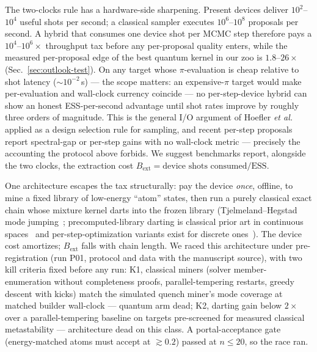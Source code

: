 \documentclass[aps,prx,reprint,floatfix,amsmath,amssymb,amsfonts]{revtex4-2}
\begin{document}
The two-clocks rule has a hardware-side sharpening. Present devices
deliver $10^{2}$--$10^{4}$ useful shots per second; a classical sampler
executes $10^{6}$--$10^{8}$ proposals per second. A hybrid that
consumes one device shot per MCMC step therefore pays a
$10^{4}$--$10^{6}\times$ throughput tax before any per-proposal quality
enters, while the measured per-proposal edge of the best quantum kernel
in our zoo is $1.8$--$26\times$ (Sec.~\ref{sec:outlook-test}). On any
target whose $\pi$-evaluation is cheap relative to shot latency
($\sim\!10^{-2}$\,s) --- the scope matters: an expensive-$\pi$ target
would make per-evaluation and wall-clock currency coincide --- no
per-step-device hybrid can show an honest ESS-per-second advantage
until shot rates improve by roughly three orders of magnitude. This is
the general I/O argument of Hoefler \emph{et
al.}~\cite{Hoefler2023} applied as a design selection rule for
sampling, and recent per-step proposals~\cite{AraiKadowaki2025,Lin2025}
report spectral-gap or per-step gains with no wall-clock metric ---
precisely the accounting the protocol above forbids. We suggest
benchmarks report, alongside the two clocks, the extraction cost
$B_{\mathrm{ext}} = \text{device shots consumed}/\text{ESS}$.

One architecture escapes the tax structurally: pay the device
\emph{once}, offline, to mine a fixed library of low-energy ``atom''
states, then run a purely classical exact chain whose mixture kernel
darts into the frozen library (Tjelmeland--Hegstad mode
jumping~\cite{Tjelmeland2001}; precomputed-library darting is classical
prior art in continuous spaces~\cite{Andricioaei2001,Sminchisescu2011}
and per-step-optimization variants exist for discrete
ones~\cite{Hubin2018}). The device cost amortizes; $B_{\mathrm{ext}}$
falls with chain length. We raced this architecture under
pre-registration (run P01, protocol and data with the manuscript
source), with two kill criteria fixed before any run: K1, classical
miners (solver member-enumeration without completeness proofs,
parallel-tempering restarts, greedy descent with kicks) match the
simulated quench miner's mode coverage at matched builder wall-clock
--- quantum arm dead; K2, darting gain below $2\times$ over a
parallel-tempering baseline on targets pre-screened for measured
classical metastability --- architecture dead on this class. A
portal-acceptance gate (energy-matched atoms must accept at
$\gtrsim 0.2$) passed at $n\le 20$, so the race ran.
\end{document}
